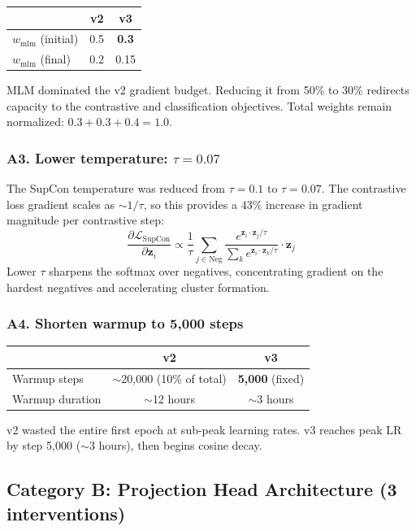 \documentclass[11pt,a4paper]{article}
\newcommand{\loss}{\mathcal{L}}
\newcommand{\supcon}{\text{SupCon}}
\begin{document}
\begin{tabular}{lcc}
\toprule
& \textbf{v2} & \textbf{v3} \\
\midrule
$w_{\text{mlm}}$ (initial) & 0.5 & \textbf{0.3} \\
$w_{\text{mlm}}$ (final) & 0.2 & 0.15 \\
\bottomrule
\end{tabular}

\medskip
MLM dominated the v2 gradient budget. Reducing it from 50\% to 30\%
redirects capacity to the contrastive and classification objectives.
Total weights remain normalized: $0.3 + 0.3 + 0.4 = 1.0$.

\subsubsection{A3. Lower temperature: $\tau = 0.07$}

The SupCon temperature was reduced from $\tau = 0.1$ to $\tau = 0.07$.
The contrastive loss gradient scales as $\sim 1/\tau$, so this provides
a $43\%$ increase in gradient magnitude per contrastive step:
\[
\frac{\partial \loss_{\supcon}}{\partial \mathbf{z}_i} \propto
\frac{1}{\tau} \sum_{j \in \text{Neg}} \frac{e^{\mathbf{z}_i \cdot \mathbf{z}_j / \tau}}
{\sum_k e^{\mathbf{z}_i \cdot \mathbf{z}_k / \tau}} \cdot \mathbf{z}_j
\]
Lower $\tau$ sharpens the softmax over negatives, concentrating gradient on
the hardest negatives and accelerating cluster formation.

\subsubsection{A4. Shorten warmup to 5{,}000 steps}

\begin{tabular}{lcc}
\toprule
& \textbf{v2} & \textbf{v3} \\
\midrule
Warmup steps & $\sim$20{,}000 (10\% of total) & \textbf{5{,}000} (fixed) \\
Warmup duration & $\sim$12 hours & $\sim$3 hours \\
\bottomrule
\end{tabular}

\medskip
v2 wasted the entire first epoch at sub-peak learning rates. v3 reaches
peak LR by step 5{,}000 ($\sim$3 hours), then begins cosine decay.

\subsection{Category B: Projection Head Architecture (3 interventions)}
\end{document}
